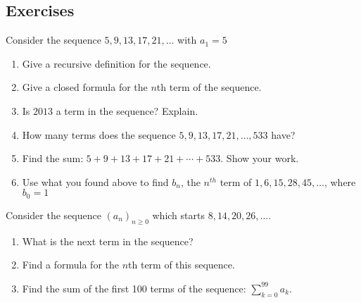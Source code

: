 \documentclass[11pt,]{book}
\theoremstyle{ptxplainnotitle}
\theoremstyle{ptxplaintitle}
\theoremstyle{ptxdefinitionnotitle}
\theoremstyle{ptxdefinitiontitle}
\theoremstyle{ptxdefinitionnotitle}
\theoremstyle{ptxdefinitiontitle}
\theoremstyle{ptxdefinitionnotitle}
\theoremstyle{ptxdefinitiontitle}
\theoremstyle{ptxdefinitiontitlenonumber}
\theoremstyle{ptxdefinitiontitlenonumber}
\numberwithin{equation}{chapter}
\begin{document}
\subsection*{Exercises}\hypertarget{exercises_seq-arithgeom}{}
\begin{divisionexercise}{1}\hypertarget{exercise-13}{}
\hypertarget{p-225}{}%
Consider the sequence \(5, 9, 13, 17, 21, \ldots\) with \(a_1 = 5\)%
\par
\hypertarget{p-226}{}%
\leavevmode%
\begin{enumerate}[label=(\alph*)]
\item\hypertarget{li-127}{}\hypertarget{p-227}{}%
Give a recursive definition for the sequence.%
\item\hypertarget{li-128}{}\hypertarget{p-228}{}%
Give a closed formula for the \(n\)th term of the sequence.%
\item\hypertarget{li-129}{}\hypertarget{p-229}{}%
Is \(2013\) a term in the sequence? Explain.%
\item\hypertarget{li-130}{}\hypertarget{p-230}{}%
How many terms does the sequence \(5, 9, 13, 17, 21, \ldots, 533\) have?%
\item\hypertarget{li-131}{}\hypertarget{p-231}{}%
Find the sum: \(5 + 9 + 13 + 17 + 21 + \cdots + 533\). Show your work.%
\item\hypertarget{li-132}{}\hypertarget{p-232}{}%
Use what you found above to find \(b_n\), the \(n^{th}\) term of \(1, 6, 15, 28, 45, \ldots\), where \(b_0 = 1\)%
\end{enumerate}
%
\end{divisionexercise}%
\begin{divisionexercise}{2}\hypertarget{exercise-14}{}
\hypertarget{p-245}{}%
Consider the sequence \((a_n)_{n \ge 0}\) which starts \(8, 14, 20, 26, \ldots\text{.}\)%
\par
\hypertarget{p-246}{}%
\leavevmode%
\begin{enumerate}[label=\alph*.]
\item\hypertarget{li-145}{}\hypertarget{p-247}{}%
What is the next term in the sequence?%
\item\hypertarget{li-146}{}\hypertarget{p-249}{}%
Find a formula for the \(n\)th term of this sequence.%
\item\hypertarget{li-147}{}\hypertarget{p-250}{}%
Find the sum of the first 100 terms of the sequence: \(\sum_{k=0}^{99}a_k\text{.}\)%
\end{enumerate}
%
\end{divisionexercise}%
\end{document}

